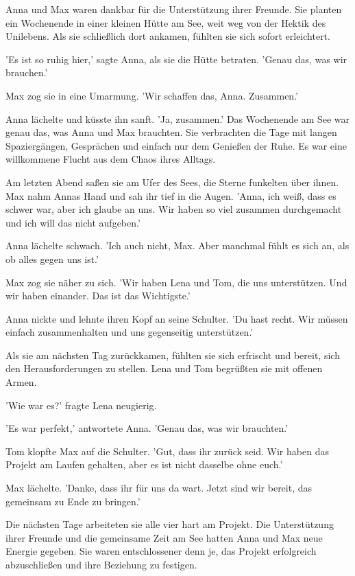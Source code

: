 \documentclass[12pt]{article}
\begin{document}
Anna und Max waren dankbar für die Unterstützung ihrer Freunde. Sie planten ein Wochenende in einer kleinen Hütte am See, weit weg von der Hektik des Unilebens. Als sie schließlich dort ankamen, fühlten sie sich sofort erleichtert.

'Es ist so ruhig hier,' sagte Anna, als sie die Hütte betraten. 'Genau das, was wir brauchen.'

Max zog sie in eine Umarmung. 'Wir schaffen das, Anna. Zusammen.'

Anna lächelte und küsste ihn sanft. 'Ja, zusammen.' Das Wochenende am See war genau das, was Anna und Max brauchten. Sie verbrachten die Tage mit langen Spaziergängen, Gesprächen und einfach nur dem Genießen der Ruhe. Es war eine willkommene Flucht aus dem Chaos ihres Alltags.

Am letzten Abend saßen sie am Ufer des Sees, die Sterne funkelten über ihnen. Max nahm Annas Hand und sah ihr tief in die Augen. 'Anna, ich weiß, dass es schwer war, aber ich glaube an uns. Wir haben so viel zusammen durchgemacht und ich will das nicht aufgeben.'

Anna lächelte schwach. 'Ich auch nicht, Max. Aber manchmal fühlt es sich an, als ob alles gegen uns ist.'

Max zog sie näher zu sich. 'Wir haben Lena und Tom, die uns unterstützen. Und wir haben einander. Das ist das Wichtigste.'

Anna nickte und lehnte ihren Kopf an seine Schulter. 'Du hast recht. Wir müssen einfach zusammenhalten und uns gegenseitig unterstützen.'

Als sie am nächsten Tag zurückkamen, fühlten sie sich erfrischt und bereit, sich den Herausforderungen zu stellen. Lena und Tom begrüßten sie mit offenen Armen.

'Wie war es?' fragte Lena neugierig.

'Es war perfekt,' antwortete Anna. 'Genau das, was wir brauchten.'

Tom klopfte Max auf die Schulter. 'Gut, dass ihr zurück seid. Wir haben das Projekt am Laufen gehalten, aber es ist nicht dasselbe ohne euch.'

Max lächelte. 'Danke, dass ihr für uns da wart. Jetzt sind wir bereit, das gemeinsam zu Ende zu bringen.'

Die nächsten Tage arbeiteten sie alle vier hart am Projekt. Die Unterstützung ihrer Freunde und die gemeinsame Zeit am See hatten Anna und Max neue Energie gegeben. Sie waren entschlossener denn je, das Projekt erfolgreich abzuschließen und ihre Beziehung zu festigen.
\end{document}
